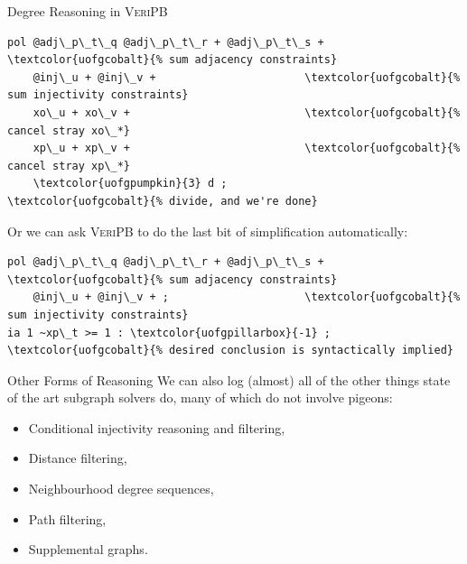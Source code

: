 \documentclass[aspectratio=169,compress,10pt]{beamer}
\makeatletter
\newcommand{\proofsystemformat}[1]{\textsc{#1}\@}
\newcommand{\veripb}{\proofsystemformat{VeriPB}\xspace}
\makeatother
\begin{document}
\begin{frame}[fragile]{Degree Reasoning in \veripb}
\begin{Verbatim}[commandchars=\\\{\},codes={\catcode`$=3\catcode`^=7\catcode`_=8}]
pol @adj\_p\_t\_q @adj\_p\_t\_r + @adj\_p\_t\_s +    \textcolor{uofgcobalt}{% sum adjacency constraints}
    @inj\_u + @inj\_v +                       \textcolor{uofgcobalt}{% sum injectivity constraints}
    xo\_u + xo\_v +                           \textcolor{uofgcobalt}{% cancel stray xo\_*}
    xp\_u + xp\_v +                           \textcolor{uofgcobalt}{% cancel stray xp\_*}
    \textcolor{uofgpumpkin}{3} d ;                                   \textcolor{uofgcobalt}{% divide, and we're done}
\end{Verbatim}

\medskip

Or we can ask \veripb to do the last bit of simplification automatically:

\medskip

\begin{Verbatim}[commandchars=\\\{\},codes={\catcode`$=3\catcode`^=7\catcode`_=8}]
pol @adj\_p\_t\_q @adj\_p\_t\_r + @adj\_p\_t\_s +    \textcolor{uofgcobalt}{% sum adjacency constraints}
    @inj\_u + @inj\_v + ;                     \textcolor{uofgcobalt}{% sum injectivity constraints}
ia 1 ~xp\_t >= 1 : \textcolor{uofgpillarbox}{-1} ;                      \textcolor{uofgcobalt}{% desired conclusion is syntactically implied}
\end{Verbatim}
\end{frame}

\begin{frame}{Other Forms of Reasoning}
    We can also log (almost) all of the other things state of the art subgraph solvers do,
    many of which do not involve pigeons:
\begin{itemize}
\item
  Conditional injectivity reasoning and filtering,
\item
  Distance filtering,
\item
  Neighbourhood degree sequences,
\item
  Path filtering,
\item
  Supplemental graphs.
\end{itemize}

\medskip

\end{frame}
\end{document}
